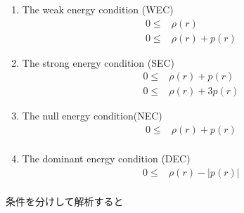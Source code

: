 \documentclass[dvipdfmx]{report} %
\begin{document}
\begin{enumerate}[(1)\,]
\item{The weak energy condition (WEC)}
\begin{equation*}
\begin{split}
	0 \leq & \rho(r)\\
	0 \leq & \rho(r) + p(r)
\end{split}
\end{equation*}
\item{The strong energy condition (SEC)}
\begin{equation*}
\begin{split}
	0 \leq & \rho(r) + p(r)\\
	0 \leq & \rho(r) + 3p(r)
\end{split}
\end{equation*}
\item{The null energy condition(NEC)}
\begin{equation*}
\begin{split}
	0 \leq & \rho(r) + p(r)\\
\end{split}
\end{equation*}
\item{The dominant energy condition (DEC)}
\begin{equation*}
\begin{split}
	0 \leq & \rho(r) - |p(r)|\\
\end{split}
\end{equation*}
\end{enumerate}
条件を分けして解析すると
\end{document}
